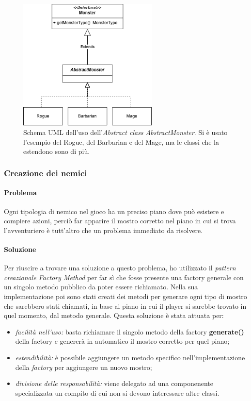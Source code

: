 \documentclass{report}
\begin{document}
\begin{figure}[H]
    \centering
    \includegraphics[width=7cm]{AbstractMonster.png}
    \caption{Schema UML dell'uso dell'\textit{Abstract class AbstractMonster}. Si è usato l'esempio del Rogue, del Barbarian e del Mage, ma le classi che la estendono sono di più.}
    \label{img:AbstractMonster}
\end{figure}

\subsubsection{Creazione dei nemici}

\paragraph{Problema} Ogni tipologia di nemico nel gioco ha un preciso piano dove può esistere e compiere azioni, perciò far apparire il mostro corretto nel piano in cui si trova l'avventuriero è
%
tutt'altro che un problema immediato da risolvere.

\paragraph{Soluzione} Per riuscire a trovare una soluzione a questo problema, ho utilizzato il \textit{pattern creazionale Factory Method} per far sì che fosse presente una factory generale
%
con un singolo metodo pubblico da poter essere richiamato. Nella sua implementazione poi sono stati creati dei metodi per generare ogni tipo di mostro che sarebbero stati chiamati, in base
%
al piano in cui il player si sarebbe trovato in quel momento, dal metodo generale. Questa soluzione è stata attuata per:

\begin{itemize}
    \item \textit{facilità nell'uso:} basta richiamare il singolo metodo della factory \textbf{generate()} della factory e genererà in automatico il mostro corretto per quel piano;
    \item \textit{estendibilità:} è possibile aggiungere un metodo specifico nell'implementazione della \textit{factory} per aggiungere un nuovo mostro;
    \item \textit{divisione delle responsabilità:} viene delegato ad una componenente specializzata un compito di cui non si devono interessare altre classi.
\end{itemize}
\end{document}
